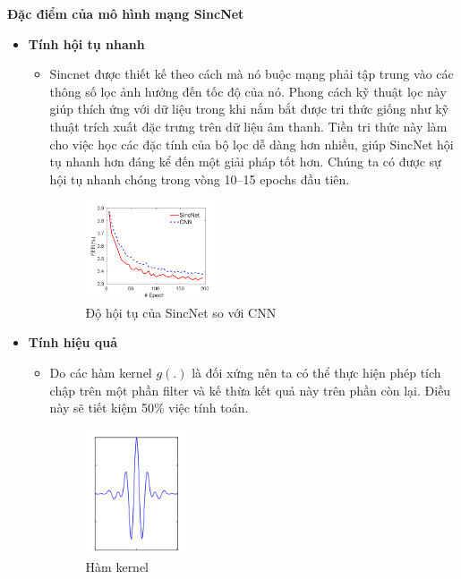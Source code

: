 \documentclass{article}
\begin{document}
	
	\textbf{Đặc điểm của mô hình mạng SincNet}
	\begin{itemize}
		\item \textbf{Tính hội tụ nhanh}
		\begin{itemize}
			\item Sincnet được thiết kế theo cách mà nó buộc mạng phải tập trung vào các thông số lọc ảnh hưởng đến tốc độ của nó. Phong cách kỹ thuật lọc này giúp thích ứng với dữ liệu trong khi nắm bắt được tri thức giống như kỹ thuật trích xuất đặc trưng trên dữ liệu âm thanh. Tiền tri thức này làm cho việc học các đặc tính của bộ lọc dễ dàng hơn nhiều, giúp SincNet hội tụ nhanh hơn đáng kể đến một giải pháp tốt hơn. Chúng ta có được sự hội tụ nhanh chóng trong vòng 10–15 epochs đầu tiên.
			\begin{figure}[H]
				\centering
				\includegraphics[width=0.4\textwidth]{images/fast_convergence.png}
				\caption{Độ hội tụ của SincNet so với CNN}
				\label{fig:writing-thesis}
			\end{figure}
		\end{itemize}
		\item \textbf{Tính hiệu quả}
		\begin{itemize}
			\item Do các hàm kernel $g(.)$ là đối xứng nên ta có thể thực hiện phép tích chập trên một phần filter và kế thừa kết quả này trên phần còn lại. Điều này sẽ tiết kiệm 50\% việc tính toán.
			\begin{figure}[H]
				\centering
				\includegraphics[width=0.3\textwidth]{images/g_symmetric.png}
				\caption{Hàm kernel}
				\label{fig:writing-thesis}
			\end{figure}

\end{itemize}
\end{itemize}
\end{document}
